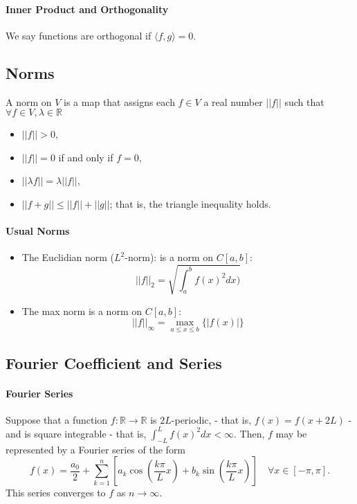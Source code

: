 \paragraph{Inner Product and Orthogonality}
We say functions are orthogonal if \(\langle f, g\rangle = 0\).

\subsection{Norms}
A norm on \(V\) is a map that assigns each \(f\in V\) a real number
\(||f||\) such that \(\forall f \in V, \lambda \in \mathbb{R}\)
\begin{itemize}
    \item \(||f|| > 0\),
    \item \(||f|| = 0\) if and only if \(f = 0\),
    \item \(||\lambda f|| = \lambda ||f||\),
    \item \(||f + g|| \leq ||f|| + ||g||\); that is, the triangle inequality holds.
\end{itemize}

\paragraph{Usual Norms}
\begin{itemize}
    \item The Euclidian norm (\(L^2\)-norm): is a norm on \(C[a, b]\):
    \[||f||_2 = \sqrt{\int_a^b f(x)^2 dx)}\]
    \item The max norm is a norm on \(C[a, b]\):
    \[||f||_\infty = \max_{a \leq x \leq b} \{|f(x)|\}\]
\end{itemize}

\subsection{Fourier Coefficient and Series}

\paragraph{Fourier Series}
Suppose that a function \(f: \mathbb{R}\to \mathbb{R}\) is \(2L\)-periodic,
- that is, \(f(x) = f(x+2L)\) - 
and is square integrable - that is, \(\int_{-L}^{L}f(x)^2 dx < \infty\).
Then, \(f\) may be represented by a Fourier series of the form
\[
    f(x) =
    \frac{a_0}{2} + \sum_{k=1}^n
    \left[
        a_k \cos\left(\frac{k\pi}{L}x\right) + b_k \sin \left(\frac{k\pi}{L}x \right)
    \right]
    \quad
    \forall x\in [-\pi, \pi].
\]
This series converges to \(f\) as \(n\to \infty\).

